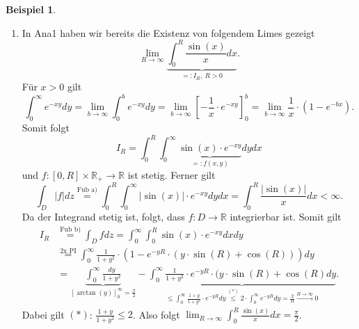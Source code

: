 \documentclass[a4paper]{scrreprt}
\newcommand{\R}{\mathbb{R}}
\newcommand{\toInf}{\rightarrow \infty}
\newcommand{\limToInf}[1]{\lim_{#1 \toInf}}
\newcommand{\jhyperref}[2]{\hyperref[j_#1]{#2}}
\newcommand{\jabb}[3]{ #1: #2 \rightarrow #3 }
\newcommand{\jshortlinkFubiniA}{\jhyperref{FubiniA}{\text{Fub a)}}}
\newcommand{\jshortlinkFubiniB}{\jhyperref{FubiniB}{\text{Fub b)}}}
\theoremstyle{plain}
\theoremstyle{definition}
\newtheorem*{expl*}{Beispiel}
\begin{document}
{{{{\begin{expl*}
\begin{enumerate}
        \item
            In Ana1 haben wir bereits die Existenz von folgendem Limes gezeigt
            \begin{displaymath}
                \limToInf{R} \underbrace{\int_0^R \frac{\sin(x)}{x}dx}_{=:I_R, \ R>0}.
            \end{displaymath}
            Für $x>0$ gilt 
            \begin{displaymath}
                \int_0^\infty e^{-xy}dy = \limToInf{b} \int_0^b e^{-xy}dy = \limToInf{b} \left[-\frac{1}{x}\cdot e^{-xy}\right]_0^b = \limToInf{b} \frac{1}{x} \cdot (1-e^{-bx}).
            \end{displaymath}
            Somit folgt
            \begin{displaymath}
                I_R = \int_0^R \int_0^\infty \underbrace{\sin(x)\cdot e^{-xy}}_{=:f(x,y)} dydx
            \end{displaymath}
            und $\jabb{f}{[0,R]\times \R_+}{\R}$ ist stetig. Ferner gilt
            \begin{displaymath}
                \int_D |f| dz \overset{\jshortlinkFubiniA}{=} \int_0^R\int_0^\infty |\sin(x)|\cdot e^{-xy} dydx = \int_0^R \frac{|\sin(x)|}{x}dx < \infty.
            \end{displaymath}
            Da der Integrand stetig ist, folgt, dass $\jabb{f}{D}{\R}$ integrierbar ist. Somit gilt
            \begin{displaymath}
                \begin{split}
                    I_R &\overset{\jshortlinkFubiniB}{=} \int_D f dz = \int_0^\infty \int_0^R \sin(x)\cdot e^{-xy} dxdy\\
                    &\overset{\text{2x PI}}{=} \int_0^\infty \frac{1}{1+y^2} \cdot \left(1-e^{-yR}\cdot(y\cdot \sin(R) + \cos(R)) \right)dy\\
                    &= \underbrace{\int_0^\infty \frac{dy}{1+y^2}}_{\left[\arctan(y)\right]_0^\infty =\frac{\pi}{2}} - \underbrace{\int_0^\infty \frac{1}{1+y^2} \cdot e^{-yR}\cdot (y\cdot \sin(R) + \cos(R)dy}_{\le \int_0^\infty \frac{1+y}{1+y^2} \cdot e^{-yR}dy \overset{(*)}{\le} 2\cdot \int_0^\infty e^{-yR}dy = \frac{2}{R} \xrightarrow{R\rightarrow\infty} 0}.
                \end{split}
            \end{displaymath}
            Dabei gilt $(*)$: $\frac{1+y}{1+y^2} \le 2$. Also folgt $\limToInf{R} \int_0^R \frac{\sin(x)}{x}dx = \frac{\pi}{2}$.
    \end{enumerate}
\end{expl*}
        
}}}}
\end{document}
